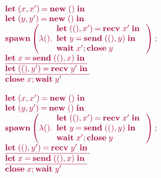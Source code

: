 \begin{figure}
  \begin{minipage}{0.5\linewidth}
    \begin{exa}\label{ex:cycle}
      \[\tm{%
          \begin{array}{l}
            \letpair{x}{x'}{\new\;\unit}{}
            \\
            \letpair{y}{y'}{\new\;\unit}{}
            \\
            \spawn\left(\lambda\unit.%
            \begin{array}{l}
                {\letpair{\unit}{x'}{\recv\;{x'}}{}}
                \\
                {\letbind{y}{\send\;{\pair{\unit}{y}}}{}}
                \\
                {\andthen{\wait\;{x'}}{\close\;{y}}}
              \end{array}%
            \right);
            \\
            \underline{\letbind{x}{\send\;{\pair{\unit}{x}}}{}}
            \\
            \underline{\letpair{\unit}{y'}{\recv\;{y'}}{}}
            \\
            {\andthen{\close\;{x}}{\wait\;{y'}}}
          \end{array}
        }\]
    \end{exa}
  \end{minipage}%
  \begin{minipage}{0.5\linewidth}
    \begin{exa}\label{ex:deadlock}
      \[\tm{%
          \begin{array}{l}
            \letpair{x}{x'}{\new\;\unit}{}
            \\
            \letpair{y}{y'}{\new\;\unit}{}
            \\
            \spawn\left(\lambda\unit.%
            \begin{array}{l}
                {\letpair{\unit}{x'}{\recv\;{x'}}{}}
                \\
                {\letbind{y}{\send\;{\pair{\unit}{y}}}{}}
                \\
                {\andthen{\wait\;{x'}}{\close\;{y}}}
              \end{array}%
            \right);
            \\
            \underline{\letpair{\unit}{y'}{\recv\;{y'}}{}}
            \\
            \underline{\letbind{x}{\send\;{\pair{\unit}{x}}}{}}
            \\
            {\andthen{\close\;{x}}{\wait\;{y'}}}
          \end{array}
        }\]
    \end{exa}
  \end{minipage}
\end{figure}

